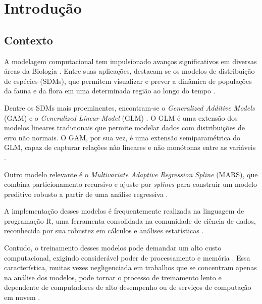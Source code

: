 \documentclass[
    12pt,               %
    openright,          %
    oneside,            %
    a4paper,            %
    english,            %
    brazil              %
    ]{abntex2}
\begin{document}
\tableofcontents*
\cleardoublepage

\textual
\chapter{Introdução}

\section{Contexto}

A modelagem computacional tem impulsionado avanços significativos em diversas áreas da Biologia \cite{modelagem_comp}. 
Entre suas aplicações, destacam-se os modelos de distribuição de espécies (SDMs), que permitem visualizar e prever 
a dinâmica de populações da fauna e da flora em uma determinada região ao longo do tempo \cite{speciesDistributionModels}.

Dentre os SDMs mais proeminentes, encontram-se o \textit{Generalized Additive Models} (GAM) \cite{GAM} e o \textit{Generalized Linear Model} (GLM) \cite{GLM}. 
O GLM é uma extensão dos modelos lineares tradicionais que permite modelar dados com distribuições de erro não normais. 
O GAM, por sua vez, é uma extensão semiparamétrica do GLM, capaz de capturar relações não lineares e não monótonas entre as variáveis \cite{GAMeGLM_especie_estudo}.

Outro modelo relevante é o \textit{Multivariate Adaptive Regression Spline} (MARS), que combina particionamento recursivo e ajuste por \textit{splines} 
para construir um modelo preditivo robusto a partir de uma análise regressiva \cite{MARS}.

A implementação desses modelos é frequentemente realizada na linguagem de programação R, uma ferramenta consolidada na comunidade de ciência de dados, 
reconhecida por sua robustez em cálculos e análises estatísticas \cite{linguagem_r}.

Contudo, o treinamento desses modelos pode demandar um alto custo computacional, exigindo considerável poder de processamento e memória \cite{modelagem_comp}. 
Essa característica, muitas vezes negligenciada em trabalhos que se concentram apenas na análise dos modelos, pode tornar o processo de treinamento lento 
e dependente de computadores de alto desempenho ou de serviços de computação em nuvem \cite{global_cloud_maketing}.
\end{document}
